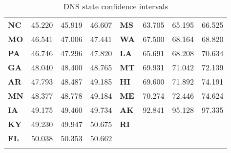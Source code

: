 \begin{longtable}{lrrr|lrrr}
\textbf{NC} &   45.220 & 45.919 &   46.607 & \textbf{MS} &   63.705 & 65.195 &   66.525 \\
\textbf{MO} &   46.541 & 47.006 &   47.441 & \textbf{WA} &   67.500 & 68.164 &   68.820 \\
\textbf{PA} &   46.746 & 47.296 &   47.820 & \textbf{LA} &   65.691 & 68.208 &   70.634 \\
\textbf{GA} &   48.040 & 48.400 &   48.765 & \textbf{MT} &   69.931 & 71.042 &   72.139 \\
\textbf{AR} &   47.793 & 48.487 &   49.185 & \textbf{HI} &   69.600 & 71.892 &   74.191 \\
\textbf{MN} &   48.377 & 48.778 &   49.184 & \textbf{ME} &   70.274 & 72.446 &   74.624 \\
\textbf{IA} &   49.175 & 49.460 &   49.734 & \textbf{AK} &   92.841 & 95.128 &   97.335 \\
\textbf{KY} &   49.230 & 49.947 &   50.675 & \textbf{RI} &          &        &          \\
\textbf{FL} &   50.038 & 50.353 &   50.662 &             &          &        &          \\
\caption{DNS state confidence intervals}
\label{tab:dns_confidence_intervals}
\end{longtable}

